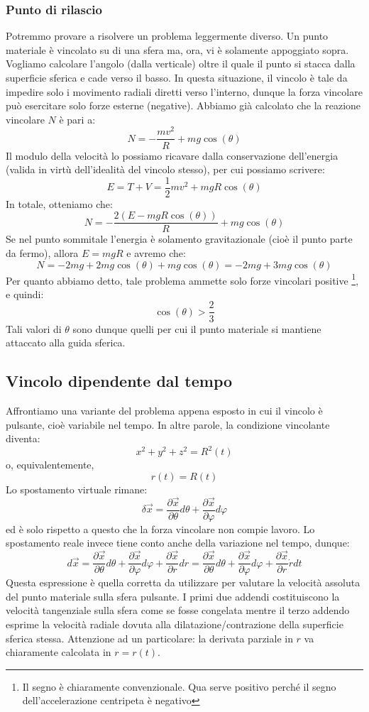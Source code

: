\documentclass[a4paper,openany]{article}
\begin{document}
	\subsubsection{Punto di rilascio}
	Potremmo provare a risolvere un problema leggermente diverso. Un punto materiale è vincolato su di una sfera ma, ora, vi è solamente appoggiato sopra. Vogliamo calcolare l'angolo (dalla verticale) oltre il quale il punto si stacca dalla superficie sferica e cade verso il basso. In questa situazione, il vincolo è tale da impedire solo i movimento radiali diretti verso l'interno, dunque la forza vincolare può esercitare solo forze esterne (negative). Abbiamo già calcolato che la reazione vincolare $N$ è pari a:
	$$
	N = - \dfrac{mv^{2}}{R} + mg\cos(\theta)
	$$
	Il modulo della velocità lo possiamo ricavare dalla conservazione dell'energia (valida in virtù dell'idealità del vincolo stesso), per cui possiamo scrivere:
	$$
	E = T + V = \dfrac{1}{2}mv^{2}+mgR\cos(\theta)
	$$
	In totale, otteniamo che:
	$$
	N = -\dfrac{2(E-mgR\cos(\theta))}{R} + mg\cos(\theta)
	$$
	Se nel punto sommitale l'energia è solamento gravitazionale (cioè il punto parte da fermo), allora $E = mgR$ e avremo che:
	$$
	N =-2mg +2mg\cos(\theta) + mg\cos(\theta) = -2mg + 3mg\cos(\theta) 
	$$
	Per quanto abbiamo detto, tale problema ammette solo forze vincolari positive \footnote{Il segno è chiaramente convenzionale. Qua serve positivo perché il segno dell'accelerazione centripeta è negativo}, e quindi:
	$$
	\cos(\theta) > \dfrac{2}{3}
	$$
	Tali valori di $\theta$ sono dunque quelli per cui il punto materiale si mantiene attaccato alla guida sferica.
	\subsection{Vincolo dipendente dal tempo}
	Affrontiamo una variante del problema appena esposto in cui il vincolo è pulsante, cioè variabile nel tempo. In altre parole, la condizione vincolante diventa:
	\begin{equation}
		x^{2}+y^{2}+z^{2} = R^{2}(t)
	\end{equation}
	o, equivalentemente,
	$$
	r(t) = R(t)
	$$
	Lo spostamento virtuale rimane:
	$$
	\delta \vec{x} = \dfrac{\partial \vec{x}}{\partial \theta} d\theta + \dfrac{\partial \vec{x}}{\partial \varphi} d\varphi
	$$
	ed è solo rispetto a questo che la forza vincolare non compie lavoro. Lo spostamento reale invece tiene conto anche della variazione nel tempo, dunque:
	$$
	d\vec{x} = \dfrac{\partial \vec{x}}{\partial \theta} d\theta + \dfrac{\partial \vec{x}}{\partial \varphi} d\varphi + \dfrac{\partial \vec{x}}{\partial r}dr = \dfrac{\partial \vec{x}}{\partial \theta} d\theta + \dfrac{\partial \vec{x}}{\partial \varphi} d\varphi + \dfrac{\partial \vec{x}}{\partial r}\dot{r}dt
	$$
	Questa espressione è quella corretta da utilizzare per valutare la velocità assoluta del punto materiale sulla sfera pulsante. I primi due addendi costituiscono la velocità tangenziale sulla sfera come se fosse congelata mentre il terzo addendo esprime la velocità radiale dovuta alla dilatazione/contrazione della superficie sferica stessa. Attenzione ad un particolare: la derivata parziale in $r$ va chiaramente calcolata in $r=r(t)$.  
	
\end{document}
